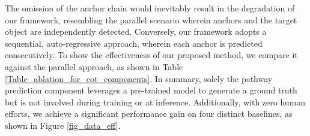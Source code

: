The omission of the anchor chain would inevitably result in the degradation of our framework, resembling the parallel scenario wherein anchors and the target object are independently detected. Conversely, our framework adopts a sequential, auto-regressive approach, wherein each anchor is predicted consecutively. To show the effectiveness of our proposed method, we compare it against the parallel approach, as shown in Table \ref{Table_ablation_for_cot_components}.
In summary, solely the pathway prediction component leverages a pre-trained model to generate a ground truth but is not involved during training or at inference. Additionally, with zero human efforts, we achieve a significant performance gain on four distinct baselines, as shown in Figure \ref{fig_data_eff}.

